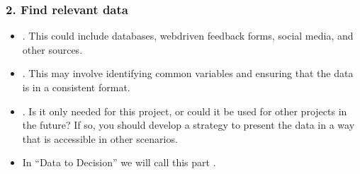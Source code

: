 \documentclass[letterpaper,10pt,english]{jupyterBook}
\begin{document}
\subsubsection{2. Find relevant data}
\label{\detokenize{1_Decision_making/Decision_making:find-relevant-data}}\begin{itemize}
\item {} 
\sphinxAtStartPar
{}. This could include databases, web\sphinxhyphen{}driven feedback forms, social media, and other sources.

\item {} 
\sphinxAtStartPar
{}. This may involve identifying common variables and ensuring that the data is in a consistent format.

\item {} 
\sphinxAtStartPar
{}. Is it only needed for this project, or could it be used for other projects in the future? If so, you should develop a strategy to present the data in a way that is accessible in other scenarios.

\item {} 
\sphinxAtStartPar
In “Data to Decision” we will call this part .

\end{itemize}
\end{document}
